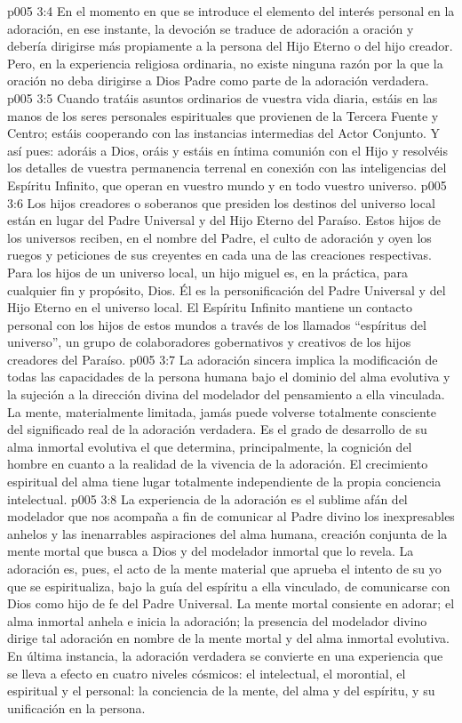 \vs p005 3:4 En el momento en que se introduce el elemento del interés personal en la adoración, en ese instante, la devoción se traduce de adoración a oración y debería dirigirse más propiamente a la persona del Hijo Eterno o del hijo creador. Pero, en la experiencia religiosa ordinaria, no existe ninguna razón por la que la oración no deba dirigirse a Dios Padre como parte de la adoración verdadera.
\vs p005 3:5 Cuando tratáis asuntos ordinarios de vuestra vida diaria, estáis en las manos de los seres personales espirituales que provienen de la Tercera Fuente y Centro; estáis cooperando con las instancias intermedias del Actor Conjunto. Y así pues: adoráis a Dios, oráis y estáis en íntima comunión con el Hijo y resolvéis los detalles de vuestra permanencia terrenal en conexión con las inteligencias del Espíritu Infinito, que operan en vuestro mundo y en todo vuestro universo.
\vs p005 3:6 \pc Los hijos creadores o soberanos que presiden los destinos del universo local están en lugar del Padre Universal y del Hijo Eterno del Paraíso. Estos hijos de los universos reciben, en el nombre del Padre, el culto de adoración y oyen los ruegos y peticiones de sus creyentes en cada una de las creaciones respectivas. Para los hijos de un universo local, un hijo miguel es, en la práctica, para cualquier fin y propósito, Dios. Él es la personificación del Padre Universal y del Hijo Eterno en el universo local. El Espíritu Infinito mantiene un contacto personal con los hijos de estos mundos a través de los llamados “espíritus del universo”, un grupo de colaboradores gobernativos y creativos de los hijos creadores del Paraíso.
\vs p005 3:7 \pc La adoración sincera implica la modificación de todas las capacidades de la persona humana bajo el dominio del alma evolutiva y la sujeción a la dirección divina del modelador del pensamiento a ella vinculada. La mente, materialmente limitada, jamás puede volverse totalmente consciente del significado real de la adoración verdadera. Es el grado de desarrollo de su alma inmortal evolutiva el que determina, principalmente, la cognición del hombre en cuanto a la realidad de la vivencia de la adoración. El crecimiento espiritual del alma tiene lugar totalmente independiente de la propia conciencia intelectual.
\vs p005 3:8 La experiencia de la adoración es el sublime afán del modelador que nos acompaña a fin de comunicar al Padre divino los inexpresables anhelos y las inenarrables aspiraciones del alma humana, creación conjunta de la mente mortal que busca a Dios y del modelador inmortal que lo revela. La adoración es, pues, el acto de la mente material que aprueba el intento de su yo que se espiritualiza, bajo la guía del espíritu a ella vinculado, de comunicarse con Dios como hijo de fe del Padre Universal. La mente mortal consiente en adorar; el alma inmortal anhela e inicia la adoración; la presencia del modelador divino dirige tal adoración en nombre de la mente mortal y del alma inmortal evolutiva. En última instancia, la adoración verdadera se convierte en una experiencia que se lleva a efecto en cuatro niveles cósmicos: el intelectual, el morontial, el espiritual y el personal: la conciencia de la mente, del alma y del espíritu, y su unificación en la persona.
